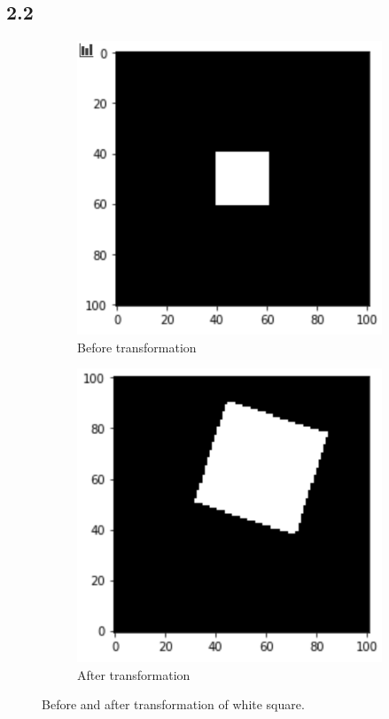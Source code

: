 \subsection*{2.2}
\begin{figure}[H]
	\begin{subfigure}[b]{0.45\linewidth}
		\centering
		\includegraphics[width=\linewidth]{Materials/E2/before}
		\caption{Before transformation}
	\end{subfigure}
	\hfill
	\begin{subfigure}[b]{0.45\linewidth}
		\centering
		\includegraphics[width=\linewidth]{Materials/E2/res}
		\caption{After transformation}
	\end{subfigure}
	\caption{Before and after transformation of white square.}
	\label{transformation}
\end{figure}
